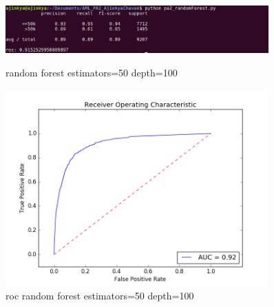\documentclass{article}
\begin{document}
\begin{figure}
    \centering
    \begin{minipage}{0.45\textwidth}
        \centering
        \includegraphics[width=0.9\textwidth]{random_50_100.png} %
        \caption{random forest estimators=50 depth=100}
    \end{minipage}\hfill
    \begin{minipage}{0.45\textwidth}
        \centering
        \includegraphics[width=0.9\textwidth]{roc_random_50_100.png} %
        \caption{roc random forest estimators=50 depth=100}
    \end{minipage}
\end{figure}
\end{document}
